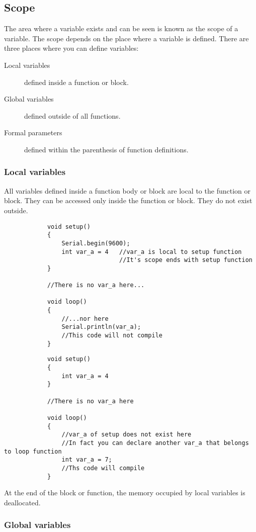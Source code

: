 \documentclass{article}
\begin{document}
	\subsection{Scope}

			The area where a variable exists and can be seen is known as the scope of a variable. The scope depends on the place where a variable is defined. There are three places where you can define variables:

			\begin{description}
			\item[Local variables] defined inside a function or block.
			\item[Global variables] defined outside of all functions.
			\item[Formal parameters] defined within the parenthesis of function definitions.
			\end{description}

		\subsubsection{Local variables}

			All variables defined inside a function body or block are local to the function or block. They can be accessed only inside the function or block. They do not exist outside.

			\begin{lstlisting}
			void setup()
			{
				Serial.begin(9600);
				int var_a = 4	//var_a is local to setup function
								//It's scope ends with setup function
			}

			//There is no var_a here...

			void loop()
			{
				//...nor here
				Serial.println(var_a);
				//This code will not compile
			}
			\end{lstlisting}

			\begin{lstlisting}
			void setup()
			{
				int var_a = 4
			}

			//There is no var_a here

			void loop()
			{
				//var_a of setup does not exist here
				//In fact you can declare another var_a that belongs to loop function
				int var_a = 7;
				//Ths code will compile
			}
			\end{lstlisting}

			At the end of the block or function, the memory occupied by local variables is deallocated.

		\subsubsection{Global variables}
\end{document}
